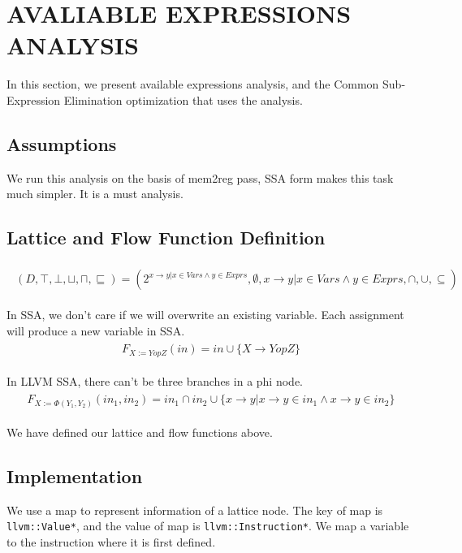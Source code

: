 \section{AVALIABLE EXPRESSIONS ANALYSIS}
In this section, we present available expressions analysis, and the Common Sub-Expression Elimination optimization that uses the analysis. 

\subsection{Assumptions}
We run this analysis on the basis of mem2reg pass, SSA form makes this task much simpler. It is a must analysis.

\subsection{Lattice and Flow Function Definition}

\begin{align} 
	\begin{split}
		(D, \top, \bot, \sqcup, \sqcap, \sqsubseteq) = (2^{x \to y | x \in Vars \wedge y \in Exprs}, \emptyset, x \to y | x \in Vars \wedge y \in Exprs, \cap, \cup, \subseteq)
	\end{split}
\end{align}

In SSA, we don't care if we will overwrite an existing variable. Each assignment will produce a new variable in SSA.
\begin{align} 
	\begin{split}
		F_{X := Y op Z}(in) = in  \cup \{ X \to Y op Z \}
	\end{split}
\end{align}

In LLVM SSA, there can't be three branches in a phi node.
\begin{align} 
	\begin{split}
		F_{X := \Phi(Y_1, Y_2)}(in_1, in_2) = in_1 \cap in_2  \cup \{x \to y | x \to y \in in_1 \wedge x \to y \in in_2\}
	\end{split}
\end{align}

We have defined our lattice and flow functions above.

\subsection{Implementation}
We use a map to represent information of a lattice node. The key of map is \texttt{llvm::Value*}, and the value of map is \texttt{llvm::Instruction*}. We map a variable to the instruction where it is first defined. \\

